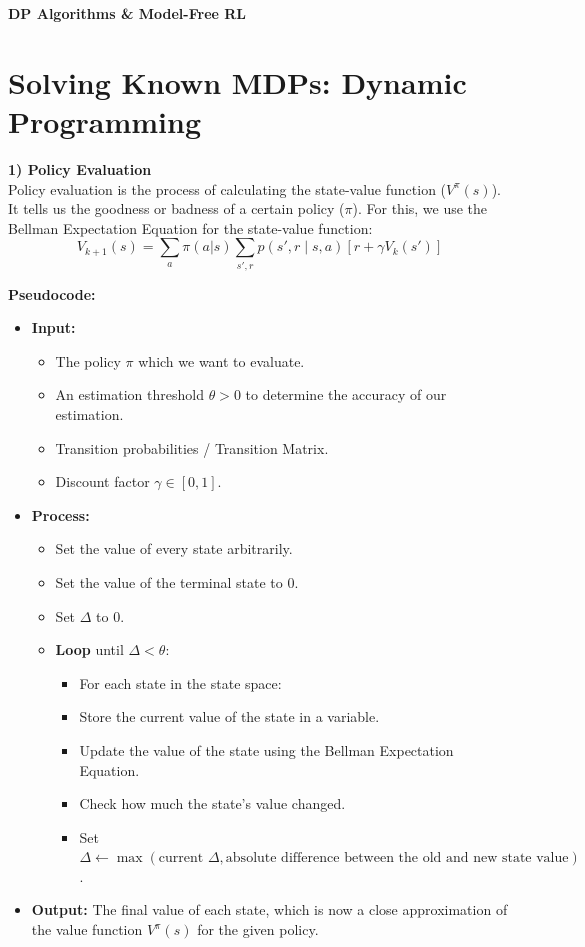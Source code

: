 \begin{center}
    \Large\textbf{\textcolor{primary}{DP Algorithms \& Model-Free RL}}
\end{center}
\vspace{0.5cm}

\section{\textcolor{secondary}{Solving Known MDPs: Dynamic Programming}}

\textbf{\textcolor{primary}{1) Policy Evaluation}} \\
Policy evaluation is the process of calculating the state-value function ($V^\pi(s)$). It tells us the goodness or badness of a certain policy ($\pi$). For this, we use the Bellman Expectation Equation for the state-value function:
\[ V_{k+1}(s) = \sum_a \pi(a|s) \sum_{s', r} p(s', r \mid s, a) \left[ r + \gamma V_k(s') \right] \]

\textbf{Pseudocode:}
\begin{itemize}
    \item \textbf{Input:}
    \begin{itemize}
        \item The policy $\pi$ which we want to evaluate.
        \item An estimation threshold $\theta > 0$ to determine the accuracy of our estimation.
        \item Transition probabilities / Transition Matrix.
        \item Discount factor $\gamma \in [0,1]$.
    \end{itemize}
    \item \textbf{Process:}
    \begin{itemize}
        \item Set the value of every state arbitrarily.
        \item Set the value of the terminal state to 0.
        \item Set $\Delta$ to 0.
        \item \textbf{Loop} until $\Delta < \theta$:
        \begin{itemize}
            \item For each state in the state space:
            \item Store the current value of the state in a variable.
            \item Update the value of the state using the Bellman Expectation Equation.
            \item Check how much the state's value changed.
            \item Set $\Delta \leftarrow \max(\text{current } \Delta, \text{absolute difference between the old and new state value})$.
        \end{itemize}
    \end{itemize}
    \item \textbf{Output:} The final value of each state, which is now a close approximation of the value function $V^\pi(s)$ for the given policy.
\end{itemize}


